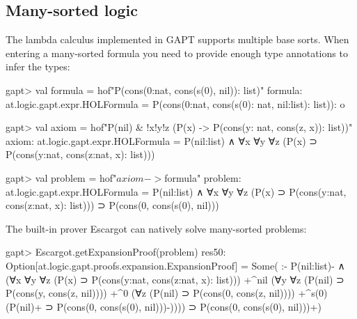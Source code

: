 \documentclass[a4paper,11pt]{article}
\begin{document}
\subsection{Many-sorted logic}

The lambda calculus implemented in GAPT supports multiple base sorts.  When
entering a many-sorted formula you need to provide enough type annotations to
infer the types:
\begin{clilisting}
gapt> val formula = hof"P(cons(0:nat, cons(s(0), nil)): list)"
formula: at.logic.gapt.expr.HOLFormula = P(cons(0:nat, cons(s(0): nat, nil:list): list)): o

gapt> val axiom = hof"P(nil) & !x!y!z (P(x) -> P(cons(y: nat, cons(z, x)): list))"
axiom: at.logic.gapt.expr.HOLFormula = P(nil:list) ∧ ∀x ∀y ∀z (P(x) ⊃ P(cons(y:nat, cons(z:nat, x): list)))

gapt> val problem = hof"$axiom -> $formula"
problem: at.logic.gapt.expr.HOLFormula =
P(nil:list) ∧ ∀x ∀y ∀z (P(x) ⊃ P(cons(y:nat, cons(z:nat, x): list))) ⊃
  P(cons(0, cons(s(0), nil)))

\end{clilisting}

The built-in prover Escargot can natively solve many-sorted problems:
\begin{clilisting}
gapt> Escargot.getExpansionProof(problem)
res50: Option[at.logic.gapt.proofs.expansion.ExpansionProof] =
Some(
:-
P(nil:list)- ∧
    (∀x ∀y ∀z (P(x) ⊃ P(cons(y:nat, cons(z:nat, x): list)))
      +^{nil}
        (∀y ∀z (P(nil) ⊃ P(cons(y, cons(z, nil))))
          +^{0}
            (∀z (P(nil) ⊃ P(cons(0, cons(z, nil))))
            +^{s(0)} (P(nil)+ ⊃ P(cons(0, cons(s(0), nil)))-)))) ⊃
  P(cons(0, cons(s(0), nil)))+)

\end{clilisting}
\end{document}

